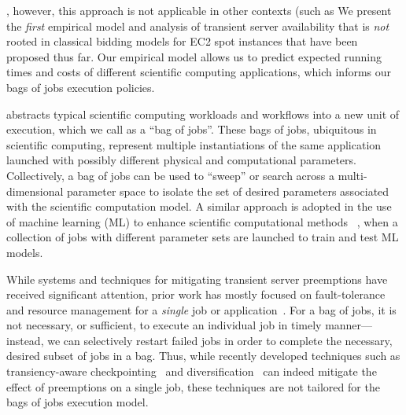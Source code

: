 , however, this approach is not applicable in other contexts (such as 
We present the \emph{first} empirical model and analysis of transient server availability that is \emph{not} rooted in classical bidding models for EC2 spot instances that have been proposed thus far. Our empirical model allows us to predict expected running times and costs of different scientific computing applications, which informs our bags of jobs execution policies.




\sysname abstracts typical scientific computing workloads and workflows into a new unit of execution, which we call as a ``bag of jobs''. 
These bags of jobs, ubiquitous in scientific computing, represent multiple instantiations of the same application launched with possibly different physical and computational parameters. 
Collectively, a bag of jobs can be used to ``sweep'' or search across a multi-dimensional parameter space to isolate the set of desired parameters associated with the scientific computation model.
A similar approach is adopted in the use of machine learning (ML) to enhance scientific computational methods ~\cite{ml.atomic2017,melko2017,sam2017,fu2017,long2015machine, ferguson2017machine,ward2018matminer}, when a collection of jobs with different  parameter sets are launched to train and test ML models.



While systems and techniques for mitigating transient server preemptions have received significant attention, prior work has mostly focused on fault-tolerance and resource management for a \emph{single} job or application~\cite{spoton, exosphere, flint, marathe2014exploiting}. 
For a bag of jobs, it is not necessary, or sufficient, to execute an individual job in timely manner---instead, we can selectively restart failed jobs in order to complete the necessary, desired subset of jobs in a bag.
Thus, while recently developed techniques such as transiency-aware checkpointing~\cite{marathe2014exploiting, flint}
and diversification~\cite{exosphere, spotweb} can indeed mitigate the effect of preemptions on a single job, these techniques are not tailored for the bags of jobs execution model. 

